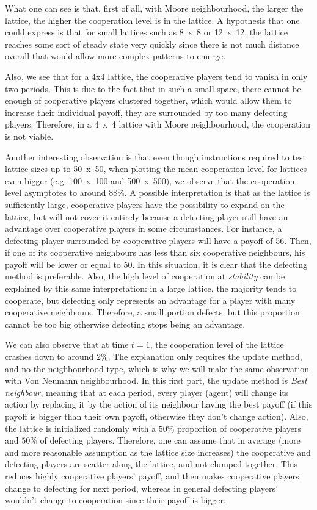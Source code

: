 \documentclass{article}
\begin{document}
What one can see is that, first of all, with Moore neighbourhood, the larger the lattice, the higher the
cooperation level is in the lattice. A hypothesis that one could express is that for small lattices
such as 8~x~8 or 12~x~12, the lattice reaches some sort of steady state very quickly since there is
not much distance overall that would allow more complex patterns to emerge.

Also, we see that for a 4x4 lattice, the cooperative players tend to vanish in only two periods.
This is due to the fact that in such a small space, there cannot be enough of cooperative players
clustered together, which would allow them to increase their individual payoff, they are surrounded
by too many defecting players. Therefore, in a 4~x~4 lattice with Moore neighbourhood, the cooperation
is not viable.

Another interesting observation is that even though instructions required to test lattice sizes up to
50~x~50, when plotting the mean  cooperation level for lattices even bigger (e.g. 100~x~100 and 500~x~500),
we observe that the cooperation level asymptotes to around $88\%$. A possible interpretation is that
as the lattice is sufficiently large, cooperative players have the possibility to expand on the lattice,
but will not cover it entirely because a defecting player still have an advantage over cooperative players
in some circumstances. For instance, a defecting player surrounded by cooperative players will have a
payoff of 56. Then, if one of its cooperative neighbours has less than six cooperative neighbours,
his payoff will be lower or equal to 50. In this situation, it is clear that the defecting method is
preferable. Also, the high level of cooperation at \textit{stability} can be explained by this same
interpretation: in a large lattice, the majority tends to cooperate, but defecting only represents an
advantage for a player with many cooperative neighbours. Therefore, a small portion defects, but this
proportion cannot be too big otherwise defecting stops being an advantage.

We can also observe that at time $t=1$, the cooperation level of the lattice crashes down to around
$2\%$. The explanation only requires the update method, and no the neighbourhood type, which is why
we will make the same observation with Von Neumann neighbourhood. In this first part, the update
method is \textit{Best neighbour}, meaning that at each period, every player (agent) will change its
action by replacing it by the action of its neighbour having the best payoff (if this payoff is
bigger than their own payoff, otherwise they don't change action). Also, the lattice is initialized
randomly with a $50\%$ proportion of cooperative players and $50\%$ of defecting players. Therefore,
one can assume that in average (more and more reasonable assumption as the lattice size increases)
the cooperative and defecting players are scatter along the lattice, and not clumped together. This
reduces highly cooperative players' payoff, and then makes cooperative players change to defecting
for next period, whereas in general defecting players' wouldn't change to cooperation since their
payoff is bigger.
\end{document}

